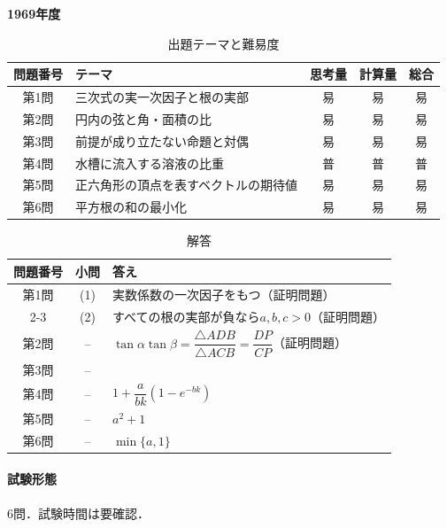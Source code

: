 \documentclass[../../main.tex]{subfiles}
\begin{document}
\begin{center}
  {\fontsize{48pt}{58pt}\selectfont \textbf{1969}\normalsize\textbf{年度}}
\end{center}

\begin{table}[htb]
  \centering
  \caption{出題テーマと難易度}
  \begin{tabular}{|c|p{6.2cm}|c|c|c|}
    \hline
    \textbf{問題番号} & \textbf{テーマ} & \textbf{思考量} & \textbf{計算量} & \textbf{総合} \\
    \hline
    第1問 & 三次式の実一次因子と根の実部 & 易 & 易 & 易 \\
    \hline
    第2問 & 円内の弦と角・面積の比 & 易 & 易 & 易 \\
    \hline
    第3問 & 前提が成り立たない命題と対偶 & 易 & 易 & 易 \\
    \hline
    第4問 & 水槽に流入する溶液の比重 & 普 & 普 & 普 \\
    \hline
    第5問 & 正六角形の頂点を表すベクトルの期待値 & 易 & 易 & 易 \\
    \hline
    第6問 & 平方根の和の最小化 & 易 & 易 & 易 \\
    \hline
  \end{tabular}
\end{table}

\begin{table}[htb]
  \centering
  \caption{解答}
  \renewcommand{\arraystretch}{1.4}
  \begin{tabular}{|c|c|p{9cm}|}
    \hline
    \textbf{問題番号} & \textbf{小問} & \textbf{答え} \\
    \hline
    第1問 & (1) & 実数係数の一次因子をもつ（証明問題） \\
    \cline{2-3}
    & (2) & すべての根の実部が負なら$a,b,c>0$（証明問題） \\
    \hline
    第2問 & -- & $\tan\alpha\tan\beta=\dfrac{\triangle ADB}{\triangle ACB}=\dfrac{DP}{CP}$（証明問題） \\
    \hline
    第3問 & -- &  \\
    \hline
    第4問 & -- & $1+\dfrac{a}{bk}(1-e^{-bk})$ \\
    \hline
    第5問 & -- & $a^2+1$ \\
    \hline
    第6問 & -- & $\min\{a,1\}$ \\
    \hline
  \end{tabular}
\end{table}

\paragraph{試験形態}
6問．試験時間は要確認．
\end{document}
